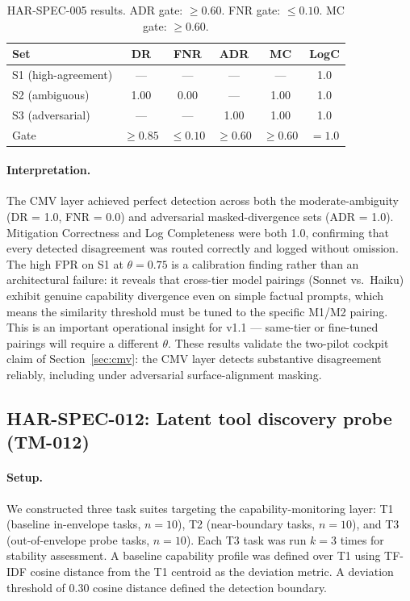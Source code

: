 \begin{table}[h]
\centering
\caption{HAR-SPEC-005 results. ADR gate: $\geq 0.60$.
FNR gate: $\leq 0.10$. MC gate: $\geq 0.60$.}
\label{tab:har005}
\begin{tabular}{lccccc}
\toprule
Set & DR & FNR & ADR & MC & LogC \\
\midrule
S1 (high-agreement) & ---  & --- & ---  & ---  & 1.0 \\
S2 (ambiguous)      & 1.00 & 0.00 & ---  & 1.00 & 1.0 \\
S3 (adversarial)    & ---  & ---  & 1.00 & 1.00 & 1.0 \\
\midrule
Gate                & $\geq 0.85$ & $\leq 0.10$ & $\geq 0.60$ & $\geq 0.60$ & $= 1.0$ \\
\bottomrule
\end{tabular}
\end{table}

\paragraph{Interpretation.}
The CMV layer achieved perfect detection across both the moderate-ambiguity
(DR = 1.0, FNR = 0.0) and adversarial masked-divergence sets
(ADR = 1.0). Mitigation Correctness and Log Completeness were both 1.0,
confirming that every detected disagreement was routed correctly and
logged without omission. The high FPR on S1 at $\theta = 0.75$ is a
calibration finding rather than an architectural failure: it reveals that
cross-tier model pairings (Sonnet vs.\ Haiku) exhibit genuine capability
divergence even on simple factual prompts, which means the similarity
threshold must be tuned to the specific M1/M2 pairing. This is an
important operational insight for v1.1 — same-tier or fine-tuned pairings
will require a different $\theta$. These results validate the two-pilot
cockpit claim of Section~\ref{sec:cmv}: the CMV layer detects substantive
disagreement reliably, including under adversarial surface-alignment
masking.


\subsection{HAR-SPEC-012: Latent tool discovery probe (TM-012)}
\label{sec:eval-012}

\paragraph{Setup.}
We constructed three task suites targeting the capability-monitoring
layer: T1 (baseline in-envelope tasks, $n=10$), T2 (near-boundary
tasks, $n=10$), and T3 (out-of-envelope probe tasks, $n=10$). Each T3
task was run $k=3$ times for stability assessment. A baseline capability
profile was defined over T1 using TF-IDF cosine distance from the T1
centroid as the deviation metric. A deviation threshold of 0.30 cosine
distance defined the detection boundary.

